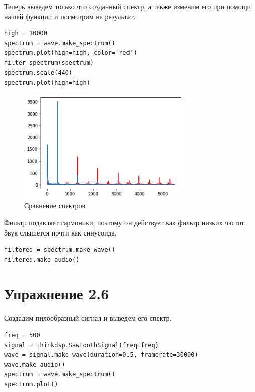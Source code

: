 \documentclass[a4paper,12pt]{report}
\begin{document}
Теперь выведем только что созданный спектр, а также изменим его при помощи нашей функции и посмотрим на результат.

\begin{lstlisting}[caption=Сравнение спектров]
high = 10000
spectrum = wave.make_spectrum()
spectrum.plot(high=high, color='red')
filter_spectrum(spectrum)
spectrum.scale(440)
spectrum.plot(high=high)
\end{lstlisting}

\begin{figure}[H]
        \centering
        \includegraphics[width=0.75\textwidth]{lab2_fig5_1.png}
        \caption{Сравнение спектров}
        \label{fig:lab2_fig5_1}
\end{figure}

Фильтр подавляет гармоники, поэтому он действует как фильтр низких частот. Звук слышется почти как синусоида.

\begin{lstlisting}[caption=Воспроизведение отфильтрованного звука]
filtered = spectrum.make_wave()
filtered.make_audio()
\end{lstlisting}

\chapter{Упражнение 2.6}

Создадим пилообразный сигнал и выведем его спектр.

\begin{lstlisting}[caption=Создание сигнала и визуализация его спектра]
freq = 500
signal = thinkdsp.SawtoothSignal(freq=freq)
wave = signal.make_wave(duration=0.5, framerate=30000)
wave.make_audio()
spectrum = wave.make_spectrum()
spectrum.plot()
\end{lstlisting}
\end{document}
